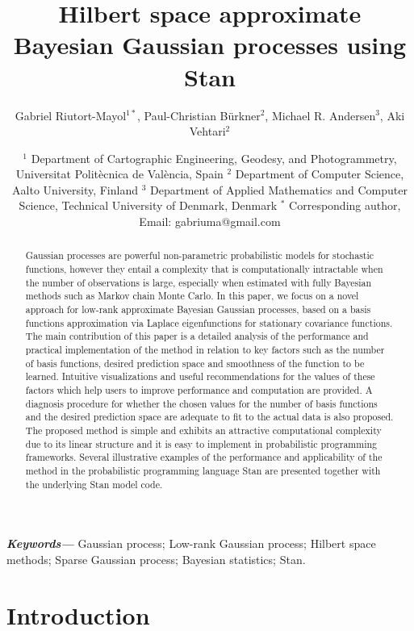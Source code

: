 \documentclass[onecolumn,a4paper,11pt]{article}
\title{Hilbert space approximate Bayesian Gaussian processes using Stan}
\author{Gabriel Riutort-Mayol$^{1*}$, Paul-Christian Bürkner$^2$, Michael R. Andersen$^{3}$, Aki Vehtari$^{2}$}
\date{ \small
$^1$ Department of Cartographic Engineering, Geodesy, and Photogrammetry, Universitat Polit\`ecnica de Val\`encia, Spain 
\break
$^2$ Department of Computer Science, Aalto University, Finland
\break
$^3$ Department of Applied Mathematics and Computer Science, Technical University of Denmark, Denmark
\break
$^*$ Corresponding author, Email: gabriuma@gmail.com
}
\providecommand{\keywords}[1]
{
  \small	
  \textbf{\textit{Keywords---}} #1
}
\begin{document}
\maketitle

\begin{abstract}
Gaussian processes are powerful non-parametric probabilistic models for stochastic functions, however they entail a complexity that is computationally intractable when the number of observations is large, especially when estimated with fully Bayesian methods such as Markov chain Monte Carlo. In this paper, we focus on a novel approach for low-rank approximate Bayesian Gaussian processes, based on a basis functions approximation via Laplace eigenfunctions for stationary covariance functions. The main contribution of this paper is a detailed analysis of the performance and practical implementation of the method in relation to key factors such as the number of basis functions, desired prediction space and smoothness of the function to be learned. Intuitive visualizations and useful recommendations for the values of these factors which help users to improve performance and computation are provided. A diagnosis procedure for whether the chosen values for the number of basis functions and the desired prediction space are adequate to fit to the actual data is also proposed. The proposed method is simple and exhibits an attractive computational complexity due to its linear structure and it is easy to implement in probabilistic programming frameworks. Several illustrative examples of the performance and applicability of the method in the probabilistic programming language Stan are presented together with the underlying Stan model code.
\end{abstract}

\keywords{Gaussian process; Low-rank Gaussian process; Hilbert space methods; Sparse Gaussian process; Bayesian statistics; Stan.}


\section{Introduction}\label{sec_bf_intro}
\end{document}
